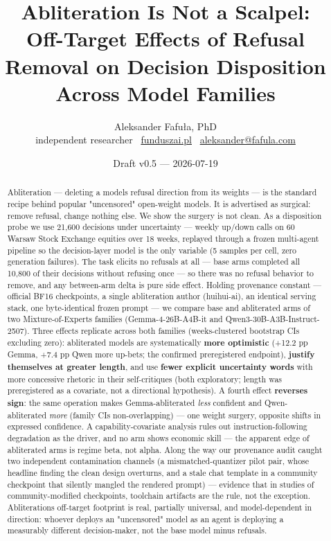 \documentclass[
  10pt,
]{article}
\author{}
\date{}
\begin{document}
\title{Abliteration Is Not a Scalpel:\\ Off-Target Effects of Refusal Removal on Decision Disposition Across Model Families}
\author{Aleksander Fafuła, PhD\\ independent researcher \textbullet\ \href{https://funduszai.pl}{funduszai.pl} \textbullet\ \href{mailto:aleksander@fafula.com}{aleksander@fafula.com}}
\date{Draft v0.5 --- 2026-07-19}
\maketitle

\begin{abstract}

Abliteration --- deleting a model\textquotesingle s refusal direction
from its weights --- is the standard recipe behind popular "uncensored"
open-weight models. It is advertised as surgical: remove refusal, change
nothing else. We show the surgery is not clean. As a disposition probe
we use 21,600 decisions under uncertainty --- weekly up/down calls on 60
Warsaw Stock Exchange equities over 18 weeks, replayed through a frozen
multi-agent pipeline so the decision-layer model is the only variable (5
samples per cell, zero generation failures). The task elicits no
refusals at all --- base arms completed all 10,800 of their decisions
without refusing once --- so there was no refusal behavior to remove,
and any between-arm delta is pure side effect. Holding provenance
constant --- official BF16 checkpoints, a single abliteration author
(huihui-ai), an identical serving stack, one byte-identical frozen
prompt --- we compare base and abliterated arms of two
Mixture-of-Experts families (Gemma-4-26B-A4B-it and
Qwen3-30B-A3B-Instruct-2507). Three effects replicate across both
families (weeks-clustered bootstrap CIs excluding zero): abliterated
models are systematically \textbf{more optimistic} (+12.2 pp Gemma, +7.4
pp Qwen more up-bets; the confirmed preregistered endpoint),
\textbf{justify themselves at greater length}, and use \textbf{fewer
explicit uncertainty words} with more concessive rhetoric in their
self-critiques (both exploratory; length was preregistered as a
covariate, not a directional hypothesis). A fourth effect \textbf{reverses sign}: the same
operation makes Gemma-abliterated \emph{less} confident and
Qwen-abliterated \emph{more} (family CIs non-overlapping) --- one weight
surgery, opposite shifts in expressed confidence. A capability-covariate
analysis rules out instruction-following degradation as the driver, and
no arm shows economic skill --- the apparent edge of abliterated arms is
regime beta, not alpha. Along the way our provenance audit caught two
independent contamination channels (a mismatched-quantizer pilot pair,
whose headline finding the clean design overturns, and a stale chat
template in a community checkpoint that silently mangled the rendered
prompt) --- evidence that in studies of community-modified checkpoints,
toolchain artifacts are the rule, not the exception.
Abliteration\textquotesingle s off-target footprint is real, partially
universal, and model-dependent in direction: whoever deploys an
"uncensored" model as an agent is deploying a measurably different
decision-maker, not the base model minus refusals.


\end{abstract}
\end{document}
